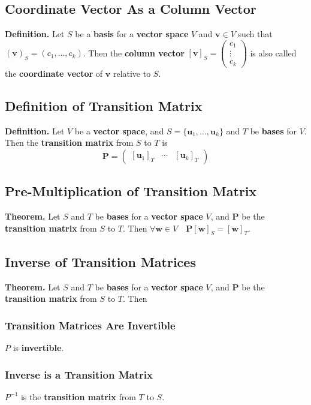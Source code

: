 \documentclass[../ma2001_notes.tex]{subfiles}
\begin{document}
\subsection{Coordinate Vector As a Column Vector}
\textbf{Definition.} Let \(S\) be a \textbf{basis} for a \textbf{vector space} \(V\) and \(\bm{v}\in V\) such that \((\bm{v})_S=(c_1,\ldots,c_k)\). Then the \textbf{column vector} \([\bm{v}]_S=\begin{pmatrix}
	c_1 \\ \vdots \\ c_k
\end{pmatrix}\) is also called the \textbf{coordinate vector} of \(\bm{v}\) relative to \(S\).

\subsection{Definition of Transition Matrix}
\textbf{Definition.} Let \(V\) be a \textbf{vector space}, and \(S=\{\bm{u}_1,\ldots,\bm{u}_k\}\) and \(T\) be \textbf{bases} for \(V\). Then the \textbf{transition matrix} from \(S\) to \(T\) is
\[\bm{P}=\begin{pmatrix}
	[\bm{u}_1]_T & \cdots & [\bm{u}_k]_T
\end{pmatrix}\]

\subsection{Pre-Multiplication of Transition Matrix}
\textbf{Theorem.} Let \(S\) and \(T\) be \textbf{bases} for a \textbf{vector space} \(V\), and \(\bm{P}\) be the \textbf{transition matrix} from \(S\) to \(T\). Then \(\forall\bm{w}\in V\quad\bm{P}[\bm{w}]_S=[\bm{w}]_T\).

\subsection{Inverse of Transition Matrices}
\textbf{Theorem.} Let \(S\) and \(T\) be \textbf{bases} for a \textbf{vector space} \(V\), and \(\bm{P}\) be the \textbf{transition matrix} from \(S\) to \(T\). Then

\subsubsection{Transition Matrices Are Invertible}
\(P\) is \textbf{invertible}.

\subsubsection{Inverse is a Transition Matrix}
\(P^{-1}\) is the \textbf{transition matrix} from \(T\) to \(S\).
\end{document}
